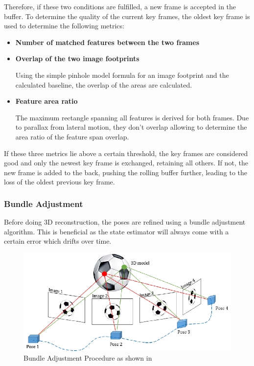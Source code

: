 Therefore, if these two conditions are fulfilled, a new frame is accepted in the buffer. To determine the quality of the current key frames, the oldest key frame is used to determine the following metrics:

\begin{itemize}
    \item \textbf{Number of matched features between the two frames}
    \item \textbf{Overlap of the two image footprints}
    
    Using the simple pinhole model formula for an image footprint and the calculated baseline, the overlap of the areas are calculated.
    \item \textbf{Feature area ratio}
    
    The maximum rectangle spanning all features is derived for both frames. Due to parallax from lateral motion, they don't overlap allowing to determine the area ratio of the feature span overlap.
\end{itemize}

If these three metrics lie above a certain threshold, the key frames are considered good and only the newest key frame is exchanged, retaining all others. If not, the new frame is added to the back, pushing the rolling buffer further, leading to the loss of the oldest previous key frame. 

\subsubsection{Bundle Adjustment}

Before doing 3D reconstruction, the poses are refined using a bundle adjustment algorithm. This is beneficial as the state estimator will always come with a certain error which drifts over time. 

\begin{figure}[ht!]
    \centering
    \includegraphics[scale=0.5]{images/system_overview/BA.png}
    \caption{Bundle Adjustment Procedure as shown in \citet{BA}}
    \label{fig:BA}
\end{figure}


